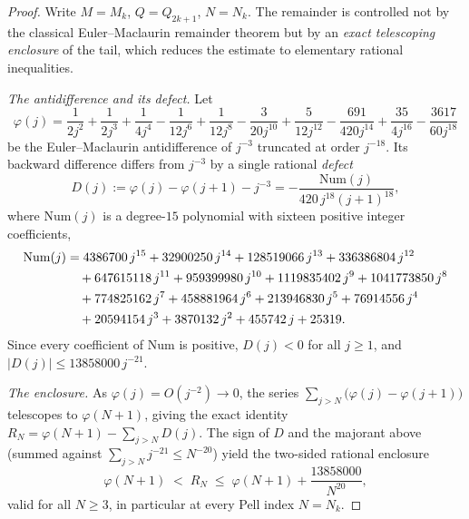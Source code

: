 \documentclass[10pt,a4paper]{amsart}
\begin{document}
\begin{proof}
  Write $M = M_k$, $Q = Q_{2k+1}$, $N = N_k$.  The remainder is
  controlled not by the classical Euler--Maclaurin remainder theorem but
  by an \emph{exact telescoping enclosure} of the tail, which reduces the
  estimate to elementary rational inequalities.

  \emph{The antidifference and its defect.}  Let
  \begin{equation}\label{eq:phidef}
    \varphi(j) = \frac{1}{2j^{2}}+\frac{1}{2j^{3}}+\frac{1}{4j^{4}}
      -\frac{1}{12j^{6}}+\frac{1}{12j^{8}}-\frac{3}{20j^{10}}
      +\frac{5}{12j^{12}}-\frac{691}{420j^{14}}+\frac{35}{4j^{16}}
      -\frac{3617}{60j^{18}}
  \end{equation}
  be the Euler--Maclaurin antidifference of $j^{-3}$ truncated at order
  $j^{-18}$.  Its backward difference differs from $j^{-3}$ by a single
  rational \emph{defect}
  \begin{equation}\label{eq:defectdef}
    D(j) := \varphi(j)-\varphi(j+1)-j^{-3}
          = -\frac{\mathrm{Num}(j)}{420\,j^{18}(j+1)^{18}},
  \end{equation}
  where $\mathrm{Num}(j)$ is a degree-$15$ polynomial with sixteen
  positive integer coefficients,
  \begin{align}\label{eq:Num}
    \mathrm{Num}(j)
      &= 4386700\,j^{15}+32900250\,j^{14}+128519066\,j^{13}
         +336386804\,j^{12}\notag\\
      &\quad+647615118\,j^{11}+959399980\,j^{10}+1119835402\,j^{9}
         +1041773850\,j^{8}\notag\\
      &\quad+774825162\,j^{7}+458881964\,j^{6}+213946830\,j^{5}
         +76914556\,j^{4}\notag\\
      &\quad+20594154\,j^{3}+3870132\,j^{2}+455742\,j+25319 .
  \end{align}
  Since every coefficient of $\mathrm{Num}$ is positive, $D(j)<0$ for all
  $j\ge 1$, and $|D(j)|\le 13858000\,j^{-21}$.

  \emph{The enclosure.}  As $\varphi(j)=O(j^{-2})\to 0$, the series
  $\sum_{j>N}\bigl(\varphi(j)-\varphi(j+1)\bigr)$ telescopes to
  $\varphi(N+1)$, giving the exact identity
  $R_N = \varphi(N+1) - \sum_{j>N} D(j)$.  The sign of $D$ and the
  majorant above (summed against $\sum_{j>N}j^{-21}\le N^{-20}$) yield the
  two-sided rational enclosure
  \begin{equation}\label{eq:enclosure}
    \varphi(N+1)\;<\;R_N\;\le\;\varphi(N+1)+\frac{13858000}{N^{20}},
  \end{equation}
  valid for all $N\ge 3$, in particular at every Pell index $N=N_k$.


\end{proof}
\end{document}
